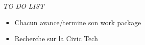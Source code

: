 \vskip 1cm
\noindent
\textit{TO DO LIST}
\vskip 0.25cm

\begin{itemize}
    \item Chacun avance/termine son work package
    \item Recherche sur la Civic Tech
\end{itemize}

